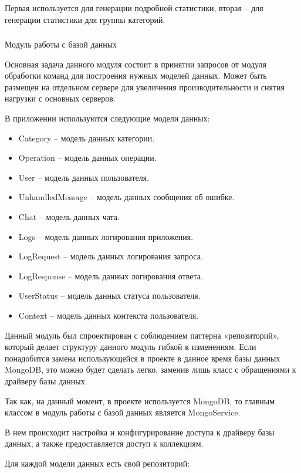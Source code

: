 Первая используется для генерации подробной статистики, вторая – для
генерации статистики для группы категорий.

\subsubsection{} Модуль работы с базой данных
\label{sec:design:server:db}

Основная задача данного модуля состоит в принятии запросов от модуля
обработки команд для построения нужных моделей данных. Может быть
размещен на отдельном сервере для увеличения производительности и снятия нагрузки с основных серверов.

В приложении используются следующие модели данных:

\begin{itemize}
	\item Category – модель данных категории.
	\item Operation – модель данных операции.
	\item User – модель данных пользователя.
	\item UnhandledMessage – модель данных сообщения об ошибке.
	\item Chat – модель данных чата.
	\item Logs – модель данных логирования приложения.
	\item LogRequest – модель данных логирования запроса.
	\item LogResponse – модель данных логирования ответа.
	\item UserStatus – модель данных статуса пользователя.
	\item Context – модель данных контекста пользователя.
\end{itemize}

Данный модуль был спроектирован с соблюдением паттерна «репозиторий», который делает структуру данного модуль гибкой к изменениям. Если понадобится замена использующейся в проекте в данное время базы данных MongoDB, это можно будет сделать легко, заменив лишь класс с обращениями к драйверу базы данных.

Так как, на данный момент, в проекте используется MongoDB, то главным классом в модуль работы с базой данных является MongoService.

В нем происходит настройка и конфигурирование доступа к драйверу базы данных, а также предоставляется доступ к коллекциям.

Для каждой модели данных есть свой репозиторий:

